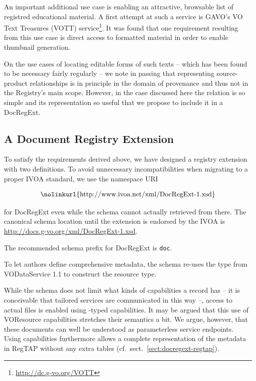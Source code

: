 \documentclass{ivoa}
\begin{document}
An important additional use case is enabling an attractive, browsable
list of registred educational material.  A first attempt at such a
service is GAVO's VO Text Treasures (VOTT)
service\footnote{\url{http://dc.g-vo.org/VOTT}}.  It was found that one
requirement resulting from this use case is direct access to formatted
material in order to enable thumbnail generation.

On the use cases of locating editable forms of such texts – which
has been found to be necessary fairly regularly – we note in passing
that representing source-product relationships is in principle in the
domain of provenance and thus not in the Registry's main scope. However, in
the case discussed here the relation is so simple and its representation
so useful that we propose to include it in a DocRegExt.

\subsection{A Document Registry Extension}


\label{sect:regext-ext}

To satisfy the requirements derived above, we have designed a registry extension with
two definitions. 
To avoid unnecessary incompatibilities when migrating to a proper IVOA
standard, we use the namespace URI

$$\hbox{\nolinkurl{http://www.ivoa.net/xml/DocRegExt-1.xsd}}$$

for DocRegExt even while the schema cannot actually retrieved from
there.  The canonical schema location until the extension is endorsed by
the IVOA is \url{http://docs.g-vo.org/xml/DocRegExt-1.xsd}.

The recommended schema prefix for DocRegExt is \texttt{doc}.

To let authors define comprehensive metadata, the schema
re-uses the  type
from VODataService 1.1 \citep{2010ivoa.spec.1202P} to construct
the  resource type.

While the schema does not limit what kinds of capabilities a
 record has -- it is conceivable that tailored
services are communicated in this way --, access to actual files is
enabled using -typed capabilities.  It may be
argued that this use of VOResource capabilities stretches their
semantics a bit.  We argue, however, that these documents can well be
understood as parameterless service endpoints.  Using capabilities
furthermore allows a complete representation of the metadata in RegTAP
without any extra tables (cf.~sect.~\ref{sect:docregext-regtap}).
\end{document}
